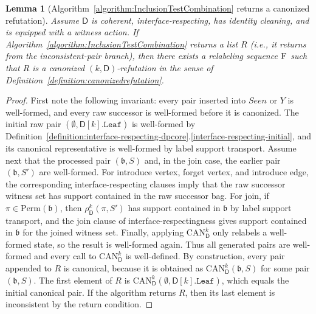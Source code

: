 \documentclass[11pt,a4paper]{article}
\newtheorem{lemma}[theorem]{Lemma}
\newcommand{\treewidthvalue}{k}
\newcommand{\abag}{\mathfrak{b}}
\newcommand{\initialsetgeneric}{\mathtt{Leaf}}
\newcommand{\dpcore}{\mathsf{D}}
\newcommand{\witnessset}{S}
\newcommand{\action}{\rho}
\newcommand{\canonic}{\mathrm{CAN}}
\newcommand{\relabelsequence}{\textsc{F}}
\begin{document}
		\begin{lemma}[Algorithm~\ref{algorithm:InclusionTestCombination} returns a canonized refutation]
		\label{lemma:algorithm-returns-canonized-refutation}
			Assume $\dpcore$ is coherent, interface-respecting, has identity cleaning, and is equipped with a witness action.
	If Algorithm~\ref{algorithm:InclusionTestCombination} returns a list $R$ (i.e., it returns from the inconsistent-pair branch), then there exists a relabeling sequence $\relabelsequence$ such that $R$ is a canonized $(\treewidthvalue,\dpcore)$-refutation in the sense of Definition~\ref{definition:canonizedrefutation}.
		\end{lemma}
		\begin{proof}
		First note the following invariant: every pair inserted into $Seen$ or $Y$ is well-formed, and every raw successor is well-formed before it is canonized.
		The initial raw pair $(\emptyset,\dpcore[\treewidthvalue].\initialsetgeneric)$ is well-formed by Definition~\ref{definition:interface-respecting-dpcore}.\ref{interface-respecting-initial}, and its canonical representative is well-formed by label support transport.
		Assume next that the processed pair $(\abag,\witnessset)$ and, in the join case, the earlier pair $(\abag,\witnessset')$ are well-formed.
		For introduce vertex, forget vertex, and introduce edge, the corresponding interface-respecting clauses imply that the raw successor witness set has support contained in the raw successor bag.
		For join, if $\pi\in \mathrm{Perm}(\abag)$, then $\action_{\dpcore}^{\treewidthvalue}(\pi,\witnessset')$ has support contained in $\abag$ by label support transport, and the join clause of interface-respectingness gives support contained in $\abag$ for the joined witness set.
		Finally, applying $\canonic_{\dpcore}^k$ only relabels a well-formed state, so the result is well-formed again.
		Thus all generated pairs are well-formed and every call to $\canonic_{\dpcore}^k$ is well-defined.
		By construction, every pair appended to $R$ is canonical, because it is obtained as $\canonic_{\dpcore}^k(\abag,\witnessset)$ for some pair $(\abag,\witnessset)$.
	The first element of $R$ is $\canonic_{\dpcore}^k(\emptyset,\dpcore[\treewidthvalue].\initialsetgeneric)$, which equals the initial canonical pair.
	If the algorithm returns $R$, then its last element is inconsistent by the return condition.


\end{proof}
\end{document}
